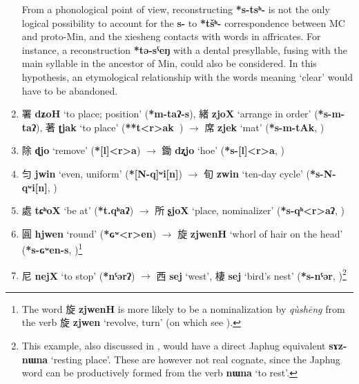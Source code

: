 \documentclass[oneside,a4paper,11pt]{article}
\newcommand{\ipa}[1]{\textbf{{\phon\mbox{#1}}}} %
\newcommand{\zh}[1]{{\cn #1}}
\newcommand{\zhc}[2]{\zh{#1} \ipa{#2}}
\begin{document}
\begin{enumerate}
{From a phonological point of view, reconstructing \ipa{*s-tsʰ-} is not the only logical possibility to account for the \ipa{s-} to \ipa{*tšʰ-} correspondence between MC and proto-Min, and the xiesheng contacts with words in affricates. For instance, a reconstruction \ipa{*tə-sˁeŋ} with a dental presyllable, fusing with the main syllable in the ancestor of Min, could also be considered. In this hypothesis, an etymological relationship with the words meaning `clear' would have to be abandoned.
} 
\item \zhc{署}{dʑoH} ‘to place; position’ (\ipa{*m-taʔ-s}),  \zhc{緒}{zjoX} ‘arrange in order’ (\ipa{*s-m-taʔ}),  \zhc{著}{ʈjak} ‘to place’ (\ipa{**t<r>ak }) $\rightarrow$  \zhc{席}{zjek} `mat’ (\ipa{*s-m-tAk},  \citealt[61]{bs14oc})
\item \zhc{除}{ɖjo} ‘remove’ (\ipa{*[l]<r>a}) $\rightarrow$ \zhc{鋤}{dʐjo} ‘hoe’ (\ipa{*s-[l]<r>a}, \citealt[81]{bs14oc})
\item \zhc{匀}{jwin} ‘even, uniform’ (\ipa{*[N-q]ʷi[n]}) $\rightarrow$ \zhc{旬}{zwin} ‘ten-day cycle’ (\ipa{*s-N-qʷi[n]}, \citealt[127]{bs14oc})
\item \zhc{處}{tɕʰoX} ‘be at’ (\ipa{*t.qʰaʔ}) $\rightarrow$ \zhc{所}{ʂjoX} ‘place, nominalizer’ (\ipa{*s-qʰ<r>aʔ}, \citealt[130]{bs14oc})
\item \zhc{圓}{hjwen} ‘round’ (\ipa{*ɢʷ<r>en}) $\rightarrow$ \zhc{旋}{zjwenH} ‘whorl of hair on the head’ (\ipa{*s-ɢʷen-s}, \citealt[141]{bs14oc})\footnote{The word \zhc{旋}{zjwenH} is more likely to be a nominalization by \textit{qùshēng} from the verb \zhc{旋}{zjwen} `revolve, turn' (on which see \citealt{downer59, jacques16ssuffixes}). }
\item \zhc{尼}{nejX} ‘to stop’ (\ipa{*nˤərʔ}) $\rightarrow$ \zhc{西}{sej} ‘west’, \zhc{棲}{sej} ‘bird’s nest’  (\ipa{*s-nˤər}, \citealt[147]{bs14oc})\footnote{This example, also discussed in \citet{sagart04directions}, would have a direct Japhug equivalent \ipa{sɤz-nɯna} `resting place'. These are however not real cognate, since the Japhug word can be productively formed from the verb  \ipa{nɯna} `to rest'.}
\end{enumerate}
 
\end{document}
